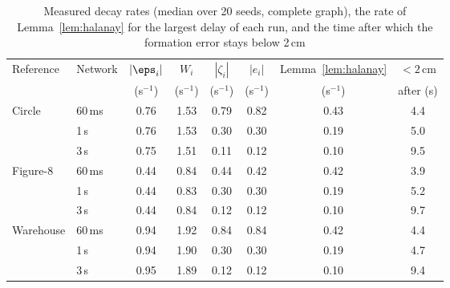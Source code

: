 \begin{table}[!t]
\caption{Measured decay rates (median over 20 seeds, complete graph), the rate of Lemma~\ref{lem:halanay} for the largest delay of each run, and the time after which the formation error stays below 2\,cm}\label{tab:meas}
\centering\footnotesize
\setlength{\tabcolsep}{2.2pt}
\begin{tabular}{@{}llcccccc@{}}\toprule
Reference & Network & $|\eps_i|$ & $W_i$ & $|\zeta_i|$ & $|e_i|$ & Lemma~\ref{lem:halanay} & $<2$\,cm\\
 & & (s$^{-1}$) & (s$^{-1}$) & (s$^{-1}$) & (s$^{-1}$) & (s$^{-1}$) & after (s)\\\midrule
Circle & 60\,ms & 0.76 & 1.53 & 0.79 & 0.82 & 0.43 & 4.4\\
 & 1\,s & 0.76 & 1.53 & 0.30 & 0.30 & 0.19 & 5.0\\
 & 3\,s & 0.75 & 1.51 & 0.11 & 0.12 & 0.10 & 9.5\\
Figure-8 & 60\,ms & 0.44 & 0.84 & 0.44 & 0.42 & 0.42 & 3.9\\
 & 1\,s & 0.44 & 0.83 & 0.30 & 0.30 & 0.19 & 5.2\\
 & 3\,s & 0.44 & 0.84 & 0.12 & 0.12 & 0.10 & 9.7\\
Warehouse & 60\,ms & 0.94 & 1.92 & 0.84 & 0.84 & 0.42 & 4.4\\
 & 1\,s & 0.94 & 1.90 & 0.30 & 0.30 & 0.19 & 4.7\\
 & 3\,s & 0.95 & 1.89 & 0.12 & 0.12 & 0.10 & 9.4\\\bottomrule
\end{tabular}
\end{table}
